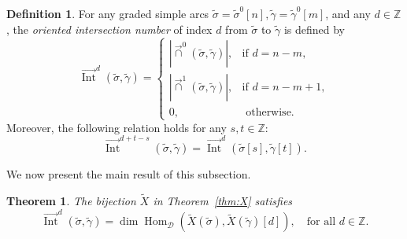 \documentclass[11pt,a4paper,reqno]{amsart}%
\theoremstyle{plain}
\newtheorem{theorem}{Theorem}[section]
\theoremstyle{definition}
\newtheorem{definition}[definition]{Definition}
\numberwithin{equation}{section}
\numberwithin{equation}{section}
\def\ZZ{\mathbb{Z}}
\newcommand{\cD}{\mathcal{D}}
\newcommand{\Hom}{\operatorname{Hom}\nolimits}
\newcommand{\oInt}{\overrightarrow{\operatorname{Int}}}
\def\Hom{\operatorname{Hom}}
\def\wX{\widetilde{X}}
\begin{document}
\begin{definition}\label{def:Int}
    For  any  graded simple  arcs 
$\widetilde{\sigma}=\widetilde{\sigma}^0[n],\widetilde{\gamma}=\widetilde{\gamma}^0[m]$, and   any
 $d\in\mathbb{Z}$, the \emph{oriented intersection number} of index $d$ from $\widetilde{\sigma}$ to $\widetilde{\gamma}$  is   defined by
    \[
\oInt^d(\widetilde{\sigma},\widetilde{\gamma})=\begin{cases}
         |\overrightarrow{\cap}^0(\widetilde{\sigma},\widetilde{\gamma})|, & \text{if  $d=n-m$},\\
         |\overrightarrow{\cap}^1(\widetilde{\sigma},\widetilde{\gamma})|, &\text{if $d=n-m+1$},\\
         0, &\text{ otherwise.}
     \end{cases}
    \]  
Moreover, the following relation holds for any $s,t\in \ZZ$:
  $$\oInt^{d+t-s}(\widetilde{\sigma},\widetilde{\gamma})=
  \oInt^{d}(\widetilde{\sigma}[s],\widetilde{\gamma}[t]).$$
\end{definition}
We now present the main result of this subsection. 
\begin{theorem}\label{thm:X2}
The bijection $\wX$ in Theorem~\ref{thm:X} satisfies
\begin{equation*} 
\oInt^d(\widetilde{\sigma} ,\widetilde{\gamma} )=\dim\Hom_{\cD} ( \wX(\widetilde{\sigma}),\wX(\widetilde{\gamma})[d] ), \quad \text{for all } d \in\ZZ.
\end{equation*}
\end{theorem}
\end{document}

